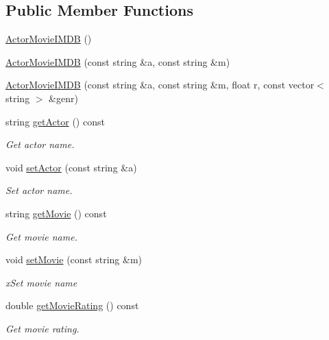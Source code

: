 \subsection*{Public Member Functions}
\begin{DoxyCompactItemize}
\item 
\hyperlink{classbridges_1_1dataset_1_1_actor_movie_i_m_d_b_a2dd3c778f60e453f1eb4eebae1b9cf69}{Actor\+Movie\+I\+M\+DB} ()
\item 
\hyperlink{classbridges_1_1dataset_1_1_actor_movie_i_m_d_b_ad25093094e26944f748c83f0cd7d3b7c}{Actor\+Movie\+I\+M\+DB} (const string \&a, const string \&m)
\item 
\hyperlink{classbridges_1_1dataset_1_1_actor_movie_i_m_d_b_acb8ea0cb67e8f9d224ed3f937ac91c7c}{Actor\+Movie\+I\+M\+DB} (const string \&a, const string \&m, float r, const vector$<$ string $>$ \&genr)
\item 
string \hyperlink{classbridges_1_1dataset_1_1_actor_movie_i_m_d_b_ad3b1e7cd85824826423153fd967e00b0}{get\+Actor} () const
\begin{DoxyCompactList}\small\item\em Get actor name. \end{DoxyCompactList}\item 
void \hyperlink{classbridges_1_1dataset_1_1_actor_movie_i_m_d_b_a1782413bd11c84384ca0eeb718eaa19f}{set\+Actor} (const string \&a)
\begin{DoxyCompactList}\small\item\em Set actor name. \end{DoxyCompactList}\item 
string \hyperlink{classbridges_1_1dataset_1_1_actor_movie_i_m_d_b_aaa204209dfe7ed6173a1a39e8cfcdbc7}{get\+Movie} () const
\begin{DoxyCompactList}\small\item\em Get movie name. \end{DoxyCompactList}\item 
void \hyperlink{classbridges_1_1dataset_1_1_actor_movie_i_m_d_b_adc95ee7566046ae60aedad96868d3ae4}{set\+Movie} (const string \&m)
\begin{DoxyCompactList}\small\item\em x\+Set movie name \end{DoxyCompactList}\item 
double \hyperlink{classbridges_1_1dataset_1_1_actor_movie_i_m_d_b_adf129339ae6aca66053774b95ff20937}{get\+Movie\+Rating} () const
\begin{DoxyCompactList}\small\item\em Get movie rating. \end{DoxyCompactList}\item 

\end{DoxyCompactItemize}
